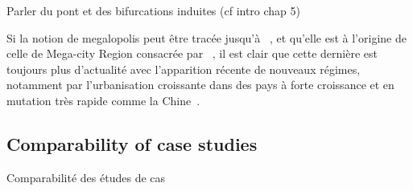 Parler du pont et des bifurcations induites (cf intro chap 5)

Si la notion de megalopolis peut être tracée jusqu'à ~\cite{gottmann1964megalopolis}, et qu'elle est à l'origine de celle de Mega-city Region consacrée par ~\cite{hall2006polycentric}, il est clair que cette dernière est toujours plus d'actualité avec l'apparition récente de nouveaux régimes, notamment par l'urbanisation croissante dans des pays à forte croissance et en mutation très rapide comme la Chine~\cite{swerts2015megacities}.







\subsection{Comparability of case studies}{Comparabilité des études de cas}













\stars




